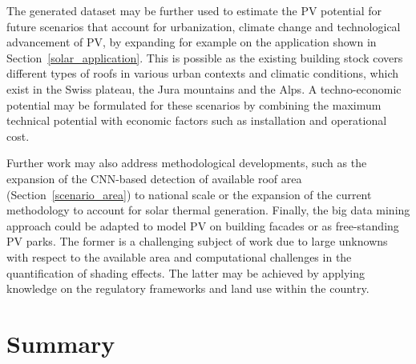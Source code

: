 The generated dataset may be further used to estimate the PV potential for future scenarios that account for urbanization, climate change and technological advancement of PV, by expanding for example on the application shown in Section~\ref{solar_application}.
This is possible as the existing building stock covers different types of roofs in various urban contexts and climatic conditions, which exist in the Swiss plateau, the Jura mountains and the Alps. 
A techno-economic potential may be formulated for these scenarios by combining the maximum technical potential with economic factors such as installation and operational cost.

Further work may also address methodological developments, such as the expansion of the CNN-based detection of available roof area (Section~\ref{scenario_area}) to national scale or the expansion of the current methodology to account for solar thermal generation.  
Finally, the big data mining approach could be adapted to model PV on building facades or as free-standing PV parks.
The former is a challenging subject of work due to large unknowns with respect to the available area and computational challenges in the quantification of shading effects. The latter may be achieved by applying knowledge on the regulatory frameworks and land use within the country.

\section{Summary}
\label{solar_conclusion}

